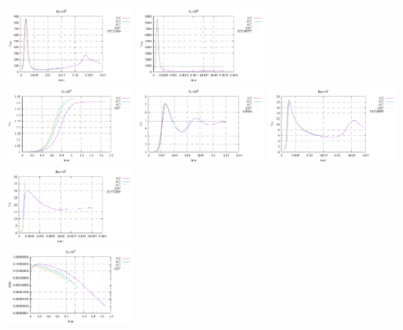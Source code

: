 \begin{center}
\includegraphics[width=4.297cm]{python_codes/fieldstone_155/results/vrms_Ra1e5}
\includegraphics[width=4.297cm]{python_codes/fieldstone_155/results/vrms_Ra1e6}\\
\includegraphics[width=4.297cm]{python_codes/fieldstone_155/results/Nu_Ra1e3}
\includegraphics[width=4.297cm]{python_codes/fieldstone_155/results/Nu_Ra1e4}
\includegraphics[width=4.297cm]{python_codes/fieldstone_155/results/Nu_Ra1e5}
\includegraphics[width=4.297cm]{python_codes/fieldstone_155/results/Nu_Ra1e6}
\\
\includegraphics[width=4.297cm]{python_codes/fieldstone_155/results/conv_u_Ra1e3}

\end{center}
